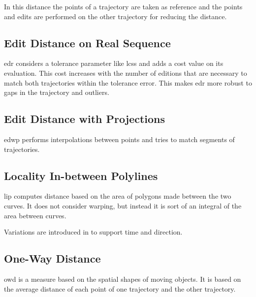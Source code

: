 In this distance the points of a trajectory are taken as reference and the points and edits are performed on the other trajectory for reducing the distance.

\subsection*{Edit Distance on Real Sequence}

\gls{edr} \cite{chen2005robust} considers a tolerance parameter like \gls{lcss} and adds a cost value on its evaluation. This cost increases with the number of editions that are necessary to match both trajectories within the tolerance error.
%
This makes \gls{edr} more robust to gaps in the trajectory and outliers.

\subsection*{Edit Distance with Projections}

\gls{edwp} \cite{ranu2015indexing} performs interpolations between points and tries to match segments of trajectories. 

\subsection*{Locality In-between Polylines}

\gls{lip} \cite{pelekis2007similarity} computes distance based on the area of polygons made between the two curves. It does not consider warping, but instead it is sort of an integral of the area between curves.

Variations are introduced in \cite{pelekis2007similarity} to support time and direction.

\subsection*{One-Way Distance}

\gls{owd} \cite{lin2005shapes} is a measure based on the spatial shapes of moving objects. It is based on the average distance of each point of one trajectory and the other trajectory.